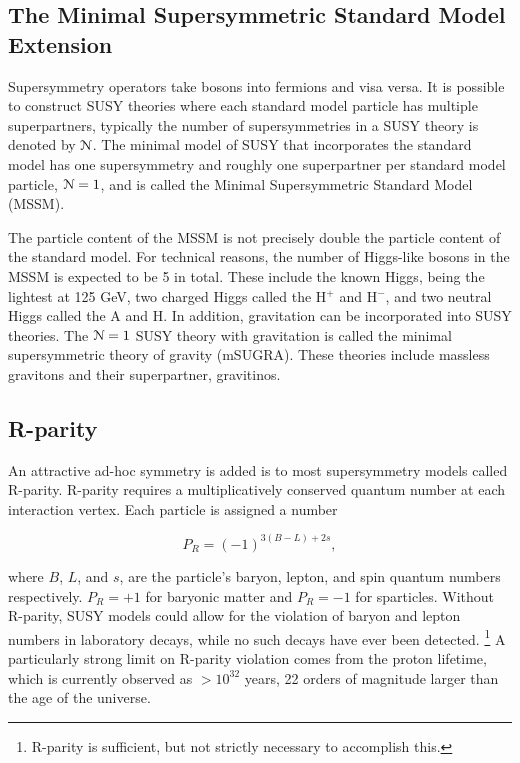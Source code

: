   \subsection{The Minimal Supersymmetric Standard Model Extension}
    Supersymmetry operators take bosons into fermions and visa versa. It is possible to construct SUSY theories where each standard model particle has multiple superpartners, typically the number of supersymmetries in a SUSY theory is denoted by $\EuScript{N}$. The minimal model of SUSY that incorporates the standard model has one supersymmetry and roughly one superpartner per standard model particle, $\EuScript{N} = 1$, and is called the Minimal Supersymmetric Standard Model (MSSM). 

    The particle content of the MSSM is not precisely double the particle content of the standard model. For technical reasons, the number of Higgs-like bosons in the MSSM is expected to be 5 in total. These include the known Higgs, being the lightest at 125 GeV, two charged Higgs called the H$^+$ and H$^-$, and two neutral Higgs called the A and H. In addition, gravitation can be incorporated into SUSY theories. The $\EuScript{N} = 1$ SUSY theory with gravitation is called the minimal supersymmetric theory of gravity (mSUGRA). These theories include massless gravitons and their superpartner, gravitinos. 

  \subsection{R-parity} \label{sec:r-parity}

    An attractive ad-hoc symmetry is added is to most supersymmetry models called R-parity. R-parity requires a multiplicatively conserved quantum number at each interaction vertex. Each particle is assigned a number

    \[
      P_R = (-1)^{3(B-L)+2s},
    \]

    where $B$, $L$, and $s$, are the particle's baryon, lepton, and spin quantum numbers respectively. $P_R = +1$ for baryonic matter and $P_R = -1$ for sparticles. Without R-parity, SUSY models could allow for the violation of baryon and lepton numbers in laboratory decays, while no such decays have ever been detected. \footnote{R-parity is sufficient, but not strictly necessary to accomplish this.} A particularly strong limit on R-parity violation comes from the proton lifetime, which is currently observed as $> 10^{32}$ years, 22 orders of magnitude larger than the age of the universe. 

